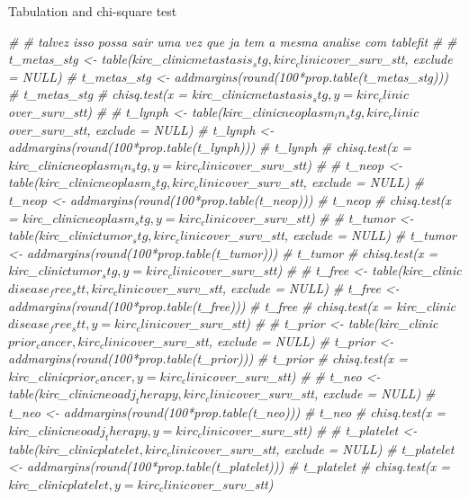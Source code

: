 \documentclass[]{article}
\newenvironment{Shaded}{\begin{snugshade}}{\end{snugshade}}
\newcommand{\CommentTok}[1]{\textcolor[rgb]{0.56,0.35,0.01}{\textit{#1}}}
\begin{document}
Tabulation and chi-square test

\begin{Shaded}
\begin{Highlighting}[]
\CommentTok{# # talvez isso possa sair uma vez que ja tem a mesma analise com tablefit}
\CommentTok{# }
\CommentTok{# t_metas_stg <- table(kirc_clinic$metastasis_stg, kirc_clinic$over_surv_stt, exclude = NULL)}
\CommentTok{# t_metas_stg <- addmargins(round(100*prop.table(t_metas_stg)))}
\CommentTok{# t_metas_stg}
\CommentTok{# chisq.test(x = kirc_clinic$metastasis_stg, y = kirc_clinic$over_surv_stt) }
\CommentTok{# }
\CommentTok{# t_lynph <- table(kirc_clinic$neoplasm_ln_stg, kirc_clinic$over_surv_stt, exclude = NULL)}
\CommentTok{# t_lynph <- addmargins(round(100*prop.table(t_lynph)))}
\CommentTok{# t_lynph}
\CommentTok{# chisq.test(x = kirc_clinic$neoplasm_ln_stg, y = kirc_clinic$over_surv_stt) }
\CommentTok{# }
\CommentTok{# t_neop <- table(kirc_clinic$neoplasm_stg, kirc_clinic$over_surv_stt, exclude = NULL)}
\CommentTok{# t_neop <- addmargins(round(100*prop.table(t_neop)))}
\CommentTok{# t_neop}
\CommentTok{# chisq.test(x = kirc_clinic$neoplasm_stg, y = kirc_clinic$over_surv_stt) }
\CommentTok{# }
\CommentTok{# t_tumor <- table(kirc_clinic$tumor_stg, kirc_clinic$over_surv_stt, exclude = NULL)}
\CommentTok{# t_tumor <- addmargins(round(100*prop.table(t_tumor)))}
\CommentTok{# t_tumor}
\CommentTok{# chisq.test(x = kirc_clinic$tumor_stg, y = kirc_clinic$over_surv_stt) }
\CommentTok{# }
\CommentTok{# t_free <- table(kirc_clinic$disease_free_stt, kirc_clinic$over_surv_stt, exclude = NULL)}
\CommentTok{# t_free <- addmargins(round(100*prop.table(t_free)))}
\CommentTok{# t_free}
\CommentTok{# chisq.test(x = kirc_clinic$disease_free_stt, y = kirc_clinic$over_surv_stt) }
\CommentTok{# }
\CommentTok{# t_prior <- table(kirc_clinic$prior_cancer, kirc_clinic$over_surv_stt, exclude = NULL)}
\CommentTok{# t_prior <- addmargins(round(100*prop.table(t_prior)))}
\CommentTok{# t_prior}
\CommentTok{# chisq.test(x = kirc_clinic$prior_cancer, y = kirc_clinic$over_surv_stt) }
\CommentTok{# }
\CommentTok{# t_neo <- table(kirc_clinic$neoadj_therapy, kirc_clinic$over_surv_stt, exclude = NULL)}
\CommentTok{# t_neo <- addmargins(round(100*prop.table(t_neo)))}
\CommentTok{# t_neo}
\CommentTok{# chisq.test(x = kirc_clinic$neoadj_therapy, y = kirc_clinic$over_surv_stt) }
\CommentTok{# }
\CommentTok{# t_platelet <- table(kirc_clinic$platelet, kirc_clinic$over_surv_stt, exclude = NULL)}
\CommentTok{# t_platelet <- addmargins(round(100*prop.table(t_platelet)))}
\CommentTok{# t_platelet}
\CommentTok{# chisq.test(x = kirc_clinic$platelet, y = kirc_clinic$over_surv_stt)}

\end{Highlighting}
\end{Shaded}
\end{document}
